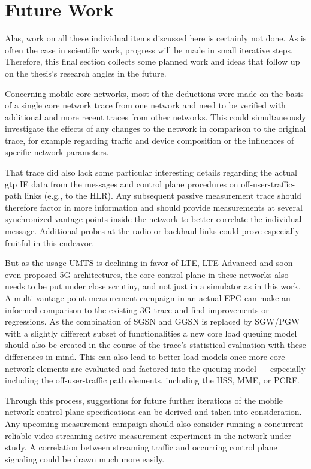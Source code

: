 \section{Future Work}

Alas, work on all these individual items discussed here is certainly not done. As is often the case in scientific work, progress will be made in small iterative steps. Therefore, this final section collects some planned work and ideas that follow up on the thesis's research angles in the future.

Concerning mobile core networks, most of the deductions were made on the basis of a single core network trace from one network and need to be verified with additional and more recent traces from other networks. This could simultaneously investigate the effects of any changes to the network in comparison to the original trace, for example regarding traffic and device composition or the influences of specific network parameters.

That trace did also lack some particular interesting details regarding the actual \gls{gtp} \gls{IE} data from the messages and control plane procedures on off-user-traffic-path links (e.g., to the \gls{HLR}). Any subsequent passive measurement trace should therefore factor in more information and should provide measurements at several synchronized vantage points inside the network to better correlate the individual message. Additional probes at the radio or backhaul links could prove especially fruitful in this endeavor. 

But as the usage \gls{UMTS} is declining in favor of \gls{LTE}, \gls{LTE}-Advanced and soon even proposed 5G architectures, the core control plane in these networks also needs to be put under close scrutiny, and not just in a simulator as in this work. A multi-vantage point measurement campaign in an actual \gls{EPC} can make an informed comparison to the existing \gls{3G} trace and find improvements or regressions. As the combination of \gls{SGSN} and \gls{GGSN} is replaced by \gls{SGW}/\gls{PGW} with a slightly different subset of functionalities a new core load queuing model should also be created in the course of the trace's statistical evaluation with these differences in mind. This can also lead to better load models once more core network elements are evaluated and factored into the queuing model --- especially including the off-user-traffic path elements, including the \gls{HSS}, \gls{MME}, or \gls{PCRF}.

Through this process, suggestions for future further iterations of the mobile network control plane specifications can be derived and taken into consideration. Any upcoming measurement campaign should also consider running a concurrent reliable video streaming active measurement experiment in the network under study. A correlation between streaming traffic and occurring control plane signaling could be drawn much more easily.


